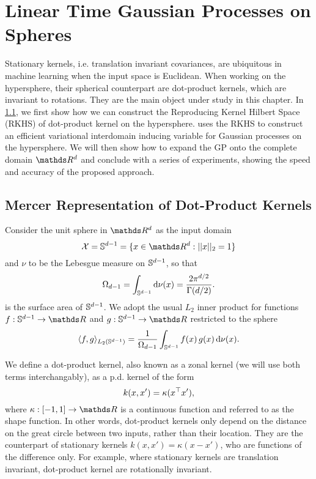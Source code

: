 \chapter{Linear Time Gaussian Processes on Spheres}
\label{chapter:vish}

Stationary kernels, i.e. translation invariant covariances, are ubiquitous in machine learning when the input space is Euclidean. When working on the hypersphere, their spherical counterpart are dot-product kernels, which are invariant to rotations. They are the main object under study in this chapter. In \cref{sec:rkhs-dotproduct-kernels}, we first show how we can construct the Reproducing Kernel Hilbert Space (RKHS) of dot-product kernel on the hypersphere.  uses the RKHS to construct an efficient variational interdomain inducing variable for Gaussian processes on the hypersphere. We will then show how to expand the GP onto the complete domain $\Reals^d$ and conclude with a series of experiments, showing the speed and accuracy of the proposed approach.

\section{Mercer Representation of Dot-Product Kernels}
\label{sec:rkhs-dotproduct-kernels}

Consider the unit sphere in $\Reals^d$  as the input domain
\begin{equation}
    \mathcal{X} = \dsphere = \{x \in \Reals^d: \norm{x}_2 = 1\}
\end{equation}
and $\nu$ to be the Lebesgue measure on $\mathbb{S}^{d-1}$, so that
\begin{equation}
    \Omega_{d-1} = \int_{\mathbb{S}^{d-1}} \mathrm{d}{\nu(x)} = \frac{2 \pi ^ {d/2}}{\Gamma(d/2)}.
\end{equation}
is the surface area of $\mathbb{S}^{d-1}$. We adopt the usual $L_2$ inner product for functions $f: \dsphere \rightarrow \Reals$ and $g: \dsphere \rightarrow \Reals$ restricted to the sphere 
\begin{equation}
     \langle f, g\rangle_{L_{2}(\mathbb{S}^{d-1})} = \frac{1}{\Omega_{d-1}} \int_{\mathbb{S}^{d-1}} f(x)\,g(x) \, \mathrm{d}{\nu(x)}.
\end{equation}

We define a dot-product kernel, also known as a zonal kernel (we will use both terms interchangably), as a p.d. kernel of the form
\begin{equation}
    k(x, x') = \kappa(x^{\top} x'),
\end{equation}
where $\kappa: [-1, 1] \rightarrow \Reals$ is a continuous function and referred to as the shape function. In other words, dot-product kernels only depend on the distance on the great circle between two inputs, rather than their location. They are the counterpart of stationary kernels $k(x, x') = \kappa(x - x')$, who are functions of the difference only. For example, where stationary kernels are translation invariant, dot-product kernel are rotationally invariant.

